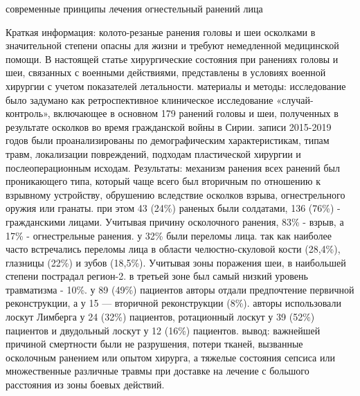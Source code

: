 
современные принципы лечения огнестельный ранений лица

Краткая информация: колото-резаные ранения головы и шеи осколками в значительной
степени опасны для жизни и требуют немедленной медицинской помощи. В настоящей
статье хирургические состояния при ранениях головы и шеи, связанных с военными
действиями, представлены в условиях военной хирургии с учетом показателей
летальности. материалы и методы: исследование было задумано как ретроспективное
клиническое исследование «случай-контроль», включающее в основном 179 ранений
головы и шеи, полученных в результате осколков во время гражданской войны в
Сирии. записи 2015-2019 годов были проанализированы по демографическим
характеристикам, типам травм, локализации повреждений, подходам пластической
хирургии и послеоперационным исходам. Результаты: механизм ранения всех ранений
был проникающего типа, который чаще всего был вторичным по отношению к взрывному
устройству, обрушению вследствие осколков взрыва, огнестрельного оружия или
гранаты. при этом 43 (24\%) раненых были солдатами, 136 (76\%) - гражданскими
лицами. Учитывая причину осколочного ранения, 83\% - взрыв, а 17\% -
огнестрельные ранения. у 32\% были переломы лица. так как наиболее часто
встречались переломы лица в области челюстно-скуловой кости (28,4\%), глазницы
(22\%) и зубов (18,5\%). Учитывая зоны поражения шеи, в наибольшей степени
пострадал регион-2. в третьей зоне был самый низкий уровень травматизма - 10\%.
у 89 (49\%) пациентов авторы отдали предпочтение первичной реконструкции, а у 15
— вторичной реконструкции (8\%). авторы использовали лоскут Лимберга у 24 (32\%)
пациентов, ротационный лоскут у 39 (52\%) пациентов и двудольный лоскут у 12
(16\%) пациентов. вывод: важнейшей причиной смертности были не разрушения,
потери тканей, вызванные осколочным ранением или опытом хирурга, а тяжелые
состояния сепсиса или множественные различные травмы при доставке на лечение с
большого расстояния из зоны боевых действий.\cite{ucak2020}

